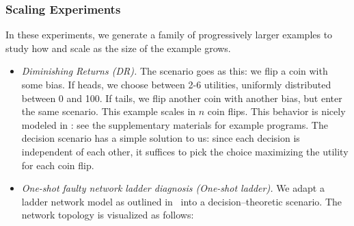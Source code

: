 \subsubsection{Scaling Experiments}

In these experiments, we generate a family
of progressively larger examples to study how \dappl{} and \dtproblog{} scale
as the size of the example grows.
\begin{itemize}[leftmargin=*]
  \item \textit{Diminishing Returns (DR).}
  The scenario goes as this: we flip a coin with some bias.  If heads, we choose
  between 2-6 utilities, uniformly distributed between 0 and 100.  If tails, we
  flip another coin with another bias, but enter the same scenario.  This
  example scales in $n$ coin flips.
  This behavior is nicely modeled in \dappl{}: see the supplementary
  materials for example programs.
  The decision scenario has a simple solution to us: since each decision is independent
  of each other, it suffices to pick the choice maximizing the utility for each coin flip.
  \item \textit{One-shot faulty network ladder diagnosis (One-shot ladder).}
  We adapt a ladder network model
  as outlined in~\citet{holtzen2020scaling} into a decision--theoretic scenario.
  The network topology is visualized as follows: 
\end{itemize}
